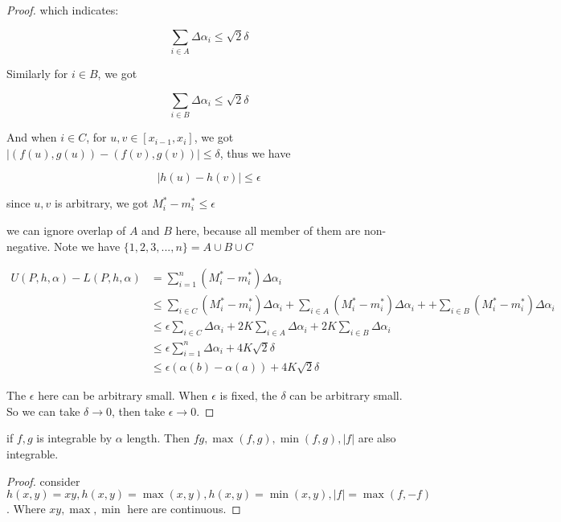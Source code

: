 \begin{proof}
    which indicates:

    \[
        \sum_{i \in A} \Delta \alpha_i \le \sqrt{2}\delta
    \]

    Similarly for $i \in B$, we got

    \[
        \sum_{i \in B} \Delta \alpha_i \le \sqrt{2}\delta
    \]


    And when $i \in C$, for $u,v \in [x_{i-1}, x_i]$, we got $|(f(u),g(u)) - (f(v),g(v))| \le \delta$, thus we have

    \[
        |h(u) - h(v)| \le \epsilon
    \]

    since $u,v$ is arbitrary, we got $M^*_i - m^*_i \le \epsilon $

    we can ignore overlap of $A$ and $B$ here, because all member of them are non-negative. 
    Note we have $\{1,2,3,...,n \} = A \cup B \cup C$

    \begin{align*}
        U(P,h, \alpha) - L(P,h,\alpha) &= \sum_{i=1}^{n}\left( M^*_i - m^*_i \right) \Delta \alpha_i \\
        & \le \sum_{i \in C}\left( M^*_i - m^*_i \right) \Delta \alpha_i + \sum_{i \in A}\left( M^*_i - m^*_i \right) \Delta \alpha_i + + \sum_{i \in B}\left( M^*_i - m^*_i \right) \Delta \alpha_i \\
        & \le \epsilon \sum_{i \in C} \Delta \alpha_i + 2K \sum_{i \in A} \Delta \alpha_i + 2K \sum_{i \in B} \Delta \alpha_i \\
        & \le \epsilon \sum_{i=1}^{n} \Delta \alpha_i + 4K \sqrt{2} \delta \\
        & \le \epsilon \left( \alpha(b) - \alpha(a)\right) +  4K \sqrt{2} \delta
    \end{align*}

    The $\epsilon$ here can be arbitrary small.
    When $\epsilon$ is fixed, the $\delta$ can be arbitrary small. So we can take $\delta \to 0$, then take $\epsilon \to 0$.
\end{proof}

\begin{corollary}
    if $f,g$ is integrable by $\alpha$ length. Then $fg, \max(f,g), \min(f,g), |f|$ are also integrable.
\end{corollary}

\begin{proof}
    consider $h(x,y) = xy, h(x,y) = \max(x,y), h(x,y) = \min(x,y), |f| = \max(f, -f)$. 
    Where $xy, \max, \min$ here are continuous.
\end{proof}


